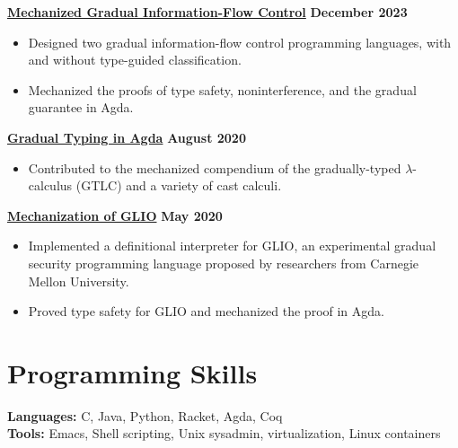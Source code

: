 {\bf \href{https://github.com/Gradual-Typing/LambdaIFCStar}{Mechanized Gradual Information-Flow Control}}
\hfill {\bf December 2023}
\begin{itemize}
\item Designed two gradual information-flow control programming languages,
  with and without type-guided classification.
\item Mechanized the proofs of type safety, noninterference, and the gradual
  guarantee in Agda.
\end{itemize}
{\bf \href{https://github.com/jsiek/gradual-typing-in-agda}{Gradual Typing in Agda}}
\hfill {\bf August 2020}
\begin{itemize}
\item Contributed to the mechanized compendium of the gradually-typed
  $\lambda$-calculus (GTLC) and a variety of cast calculi.
\end{itemize}
{\bf \href{https://github.com/Gradual-Typing/lambda-sec/tree/master/glio}{Mechanization of GLIO}}
\hfill {\bf May 2020}
\begin{itemize}
\item Implemented a definitional interpreter for GLIO, an experimental
  gradual security programming language proposed by researchers from Carnegie
  Mellon University.
\item Proved type safety for GLIO and mechanized the proof in Agda.
\end{itemize}


\section*{\sc Programming Skills}

{\bf Languages: } C, Java, Python, Racket, Agda, Coq \\
{\bf Tools: } Emacs, Shell scripting, Unix sysadmin, virtualization, Linux containers
